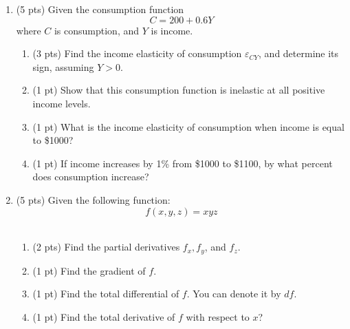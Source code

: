 \documentclass{./../../../Latex/tests}
\begin{document}
\begin{enumerate}
\newpage
\item (5 pts) Given the consumption function $$ C= 200+0.6Y  $$
where $C$ is consumption, and $Y$ is income. 
\begin{enumerate}
  \item (3 pts) Find the income elasticity of consumption $\varepsilon_{CY}$, and determine its sign, assuming $Y>0$. \\ \vspace{3.5cm}
  \item (1 pt) Show that this consumption function is inelastic at all positive income levels. \\ \vspace{2.75cm}
  \item (1 pt) What is the income elasticity of consumption when income is equal to \$1000? \\ \vspace{2.75cm}
  \item (1 pt) If income increases by 1\% from \$1000 to \$1100, by what percent does consumption increase?
\end{enumerate}

\newpage

\item (5 pts) Given the following function:
$$f(x,y,z) = xyz$$ \\
\begin{enumerate}
\item (2 pts)  Find the partial derivatives $f_x, f_y$, and $f_z$. \\ \vspace{2.75cm}
\item (1 pt) Find the gradient of $f$. \\ \vspace{2.75cm}
\item (1 pt) Find the total differential of $f$. You can denote it by $d f$. \\ \vspace{2.75cm}
\item (1 pt) Find the total derivative of $f$ with respect to $x$? \\ \vspace{2.75cm}

\end{enumerate}


\end{enumerate}
\end{document}
